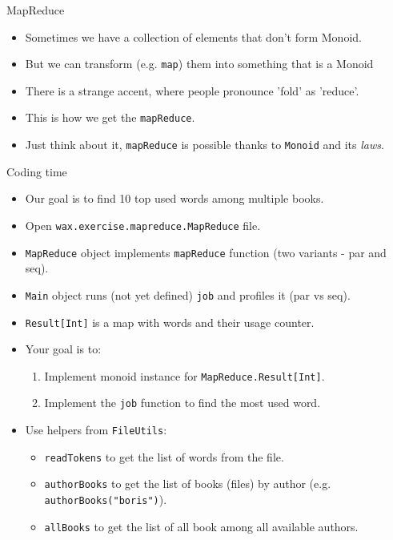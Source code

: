 \documentclass[presentation,aspectratio=169,smaller]{beamer}
\begin{document}
\begin{frame}[label={sec:org8c64c74},fragile]{MapReduce}
 \begin{itemize}
\item <1-> Sometimes we have a collection of elements that don't form Monoid.
\item <2-> But we can transform (e.g. \texttt{map}) them into something that is a Monoid
\item <3-> There is a strange accent, where people pronounce 'fold' as 'reduce'.
\item <4-> This is how we get the \texttt{mapReduce}.
\item <5-> Just think about it, \texttt{mapReduce} is possible thanks to \texttt{Monoid} and its
\emph{laws}.
\end{itemize}
\end{frame}

\begin{frame}[label={sec:orge40a328},fragile]{Coding time}
 \begin{itemize}
\item <1-> Our goal is to find 10 top used words among multiple books.
\item <2-> Open \texttt{wax.exercise.mapreduce.MapReduce} file.
\item <3-> \texttt{MapReduce} object implements \texttt{mapReduce} function (two variants - par and
seq).
\item <4-> \texttt{Main} object runs (not yet defined) \texttt{job} and profiles it (par vs seq).
\item <5-> \texttt{Result[Int]} is a map with words and their usage counter.
\item <6-> Your goal is to:
\begin{enumerate}
\item Implement monoid instance for \texttt{MapReduce.Result[Int]}.
\item Implement the \texttt{job} function to find the most used word.
\end{enumerate}
\item <7-> Use helpers from \texttt{FileUtils}:
\begin{itemize}
\item \texttt{readTokens} to get the list of words from the file.
\item \texttt{authorBooks} to get the list of books (files) by author (e.g.
\texttt{authorBooks("boris")}).
\item \texttt{allBooks} to get the list of all book among all available authors.
\end{itemize}
\end{itemize}
\end{frame}
\end{document}
